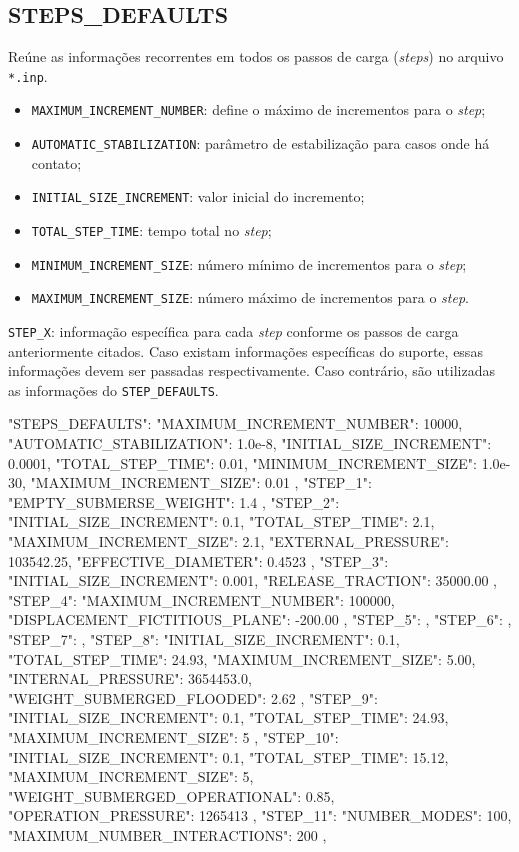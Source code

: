 \subsection{STEPS\_DEFAULTS}

Reúne as informações recorrentes em todos os passos de carga (\textit{steps}) no arquivo \texttt{*.inp}.

\begin{itemize}
  \item \texttt{MAXIMUM\_INCREMENT\_NUMBER}: define o máximo de incrementos para o \textit{step};
  \item \texttt{AUTOMATIC\_STABILIZATION}: parâmetro de estabilização para casos onde há contato;
  \item \texttt{INITIAL\_SIZE\_INCREMENT}: valor inicial do incremento;
  \item \texttt{TOTAL\_STEP\_TIME}: tempo total no \textit{step};
  \item \texttt{MINIMUM\_INCREMENT\_SIZE}: número mínimo de incrementos para o \textit{step};
  \item \texttt{MAXIMUM\_INCREMENT\_SIZE}: número máximo de incrementos para o \textit{step}.
\end{itemize}

\texttt{STEP\_X}: informação específica para cada \textit{step} conforme os passos de carga anteriormente citados. Caso existam informações específicas do suporte, essas informações devem ser passadas respectivamente. Caso contrário, são utilizadas as informações do \texttt{STEP\_DEFAULTS}.

\begin{jsoncode}
{
"STEPS_DEFAULTS": {
  "MAXIMUM_INCREMENT_NUMBER": 10000,
  "AUTOMATIC_STABILIZATION": 1.0e-8,
  "INITIAL_SIZE_INCREMENT": 0.0001,
  "TOTAL_STEP_TIME": 0.01,
  "MINIMUM_INCREMENT_SIZE": 1.0e-30,
  "MAXIMUM_INCREMENT_SIZE": 0.01
  },
  "STEP_1": {
    "EMPTY_SUBMERSE_WEIGHT": 1.4
    },
    "STEP_2": {
      "INITIAL_SIZE_INCREMENT": 0.1,
      "TOTAL_STEP_TIME": 2.1,
      "MAXIMUM_INCREMENT_SIZE": 2.1,
      "EXTERNAL_PRESSURE": 103542.25,
      "EFFECTIVE_DIAMETER": 0.4523
  },
  "STEP_3": {
    "INITIAL_SIZE_INCREMENT": 0.001,
    "RELEASE_TRACTION": 35000.00
  },
  "STEP_4": {
    "MAXIMUM_INCREMENT_NUMBER": 100000,
    "DISPLACEMENT_FICTITIOUS_PLANE": -200.00
  },
  "STEP_5": {},
  "STEP_6": {},
  "STEP_7": {},
  "STEP_8": {
    "INITIAL_SIZE_INCREMENT": 0.1,
  "TOTAL_STEP_TIME": 24.93,
  "MAXIMUM_INCREMENT_SIZE": 5.00,
  "INTERNAL_PRESSURE": 3654453.0,
  "WEIGHT_SUBMERGED_FLOODED": 2.62
  },
  "STEP_9": {
    "INITIAL_SIZE_INCREMENT": 0.1,
    "TOTAL_STEP_TIME": 24.93,
    "MAXIMUM_INCREMENT_SIZE": 5
  },
  "STEP_10": {
    "INITIAL_SIZE_INCREMENT": 0.1,
    "TOTAL_STEP_TIME": 15.12,
    "MAXIMUM_INCREMENT_SIZE": 5,
    "WEIGHT_SUBMERGED_OPERATIONAL": 0.85,
    "OPERATION_PRESSURE": 1265413
  },
  "STEP_11": {
    "NUMBER_MODES": 100,
    "MAXIMUM_NUMBER_INTERACTIONS": 200
  },
}
\end{jsoncode}

